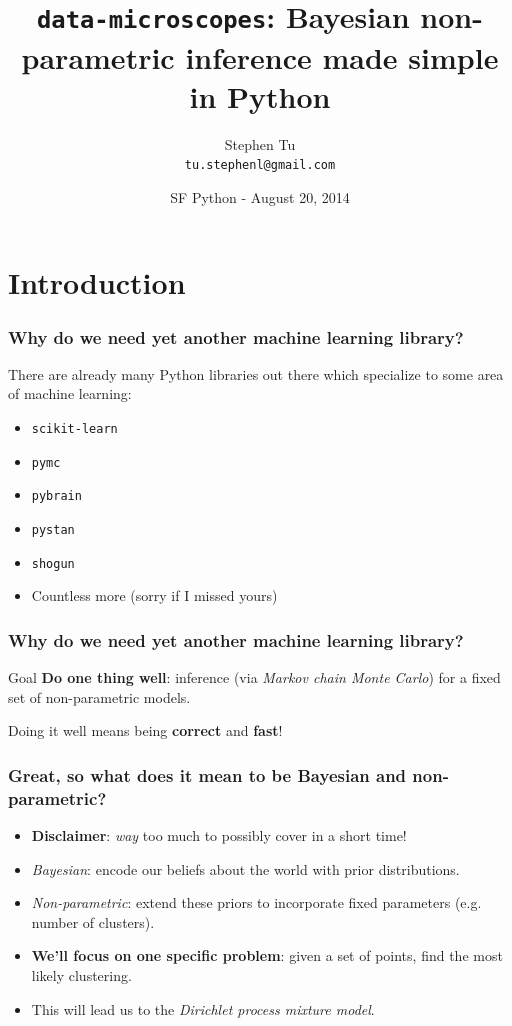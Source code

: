 \documentclass{beamer}
\title[data-microscopes]{
  \texttt{data-microscopes}: Bayesian non-parametric inference made simple in Python
}
\author[Stephen Tu]{Stephen Tu \\ \texttt{tu.stephenl@gmail.com}}
\date[SF Python]{SF Python - August 20, 2014}
\begin{document}
\begin{frame}
\titlepage
\end{frame}

\section{Introduction}

\begin{frame}
\frametitle{Why do we need yet another machine learning library?}
\pause
There are already many Python libraries out there which specialize to 
some area of machine learning: \pause
\begin{itemize}[<+->]
  \item \texttt{scikit-learn}
  \item \texttt{pymc}
  \item \texttt{pybrain}
  \item \texttt{pystan}
  \item \texttt{shogun}
  \item Countless more (sorry if I missed yours)
\end{itemize}
\end{frame}


\begin{frame}
\frametitle{Why do we need yet another machine learning library?}
\pause
\begin{block}{Goal}
\textbf{Do one thing well}: inference (via \emph{Markov chain Monte Carlo})
for a fixed set of non-parametric models.
\end{block}
\pause
Doing it well means being \textbf{correct} and \textbf{fast}!
\end{frame}

\begin{frame}
\frametitle{Great, so what does it mean to be Bayesian and non-parametric?}
\pause
\begin{itemize}[<+->]
  \item \textbf{Disclaimer}: \emph{way} too much to possibly cover in a short time!
  \item \emph{Bayesian}: encode our beliefs about the world with prior distributions.
  \item \emph{Non-parametric}: extend these priors to incorporate fixed parameters
    (e.g. number of clusters).
  \item \textbf{We'll focus on one specific problem}: 
    given a set of points, find the most likely clustering.
  \item This will lead us to the \emph{Dirichlet process mixture model}.
\end{itemize}
\end{frame}
\end{document}
